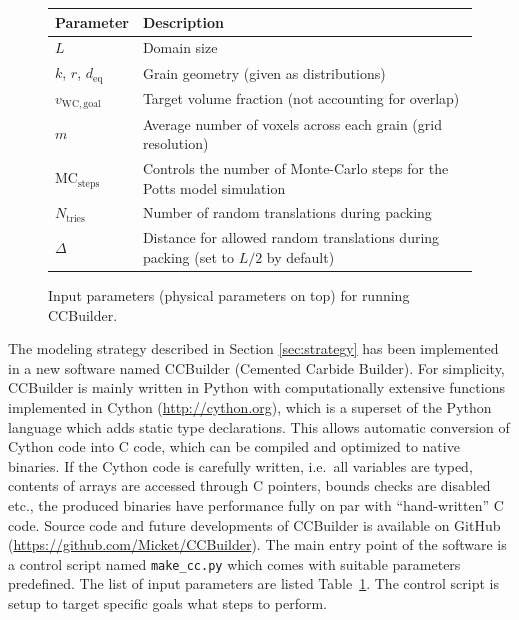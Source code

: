 \documentclass[3p,12pt]{elsarticle}
\newcommand{\WC}{\mathrm{WC}}
\begin{document}
\begin{figure}[H]
  \centering
  \begin{tabular}{l|l}
   \toprule
   Parameter & Description
   \\ \midrule
   $L$ & Domain size
   \\
   $k$, $r$, $d_\text{eq}$ & Grain geometry (given as distributions)
   \\
   $v_{\WC,\text{goal}}$ & Target volume fraction (not accounting for overlap)
   \\ \midrule
   $m$ & Average number of voxels across each grain (grid resolution)
   \\
   $\text{MC}_\text{steps}$ & Controls the number of Monte-Carlo steps for the Potts model simulation
   \\
   $N_\text{tries}$ & Number of random translations during packing
   \\
   $\Delta$ & Distance for allowed random translations during packing (set to $L/2$ by default)
   \\
   \bottomrule
  \end{tabular}
  \caption{\label{tab:input_data} Input parameters (physical parameters on top) for running CCBuilder.}
\end{figure}

The modeling strategy described in Section \ref{sec:strategy} has been implemented in a new software named CCBuilder (Cemented Carbide Builder).
For simplicity, CCBuilder is mainly written in Python with computationally extensive functions implemented in Cython (\url{http://cython.org}), which is a superset of the Python language which adds static type declarations.
This allows automatic conversion of Cython code into C code, which can be compiled and optimized to native binaries.
If the Cython code is carefully written, i.e.\ all variables are typed, contents of arrays are accessed through C pointers, bounds checks are disabled etc., the produced binaries have performance fully on par with ``hand-written'' C code.
Source code and future developments of CCBuilder is available on GitHub (\url{https://github.com/Micket/CCBuilder}).
The main entry point of the software is a control script named \verb+make_cc.py+ which comes with suitable parameters predefined.
The list of input parameters are listed Table~\ref{tab:input_data}.
The control script is setup to target specific goals what steps to perform.


\end{document}
